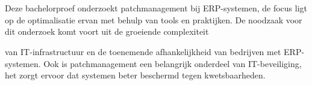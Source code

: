
%
%
%
%
%

%



\chapter*{}


Deze bachelorproef onderzoekt patchmanagement bij ERP-systemen, de focus ligt op de optimalisatie ervan met behulp van tools en praktijken. De noodzaak voor dit onderzoek komt voort uit de groeiende complexiteit

van IT-infrastructuur en de toenemende afhankelijkheid van bedrijven met ERP-systemen. Ook is patchmanagement een belangrijk onderdeel van IT-beveiliging, het zorgt ervoor dat systemen beter beschermd tegen kwetsbaarheden.

